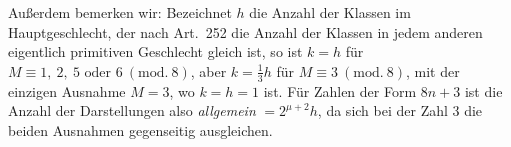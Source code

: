 Außerdem bemerken wir: Bezeichnet $h$ die Anzahl der Klassen
im Hauptgeschlecht, der nach Art.\ 252 die Anzahl der Klassen in
jedem anderen eigentlich primitiven Geschlecht gleich ist, so ist
$k=h$ für $M\equiv1,\allowbreak \ 2,\allowbreak \ 5\text{ oder }6\ (\mathrm{mod.}\ 8)$, aber $k=\tfrac{1}{3}h$ für $M\equiv3\ (\mathrm{mod.}\ 8)$, mit der einzigen
Ausnahme $M=3$, wo $k=h=1$ ist. Für Zahlen der Form $8n+3$
ist die Anzahl der Darstellungen also \textit{allgemein} $=2^{\mu+2}h$,
da sich bei der Zahl $3$ die beiden Ausnahmen gegenseitig ausgleichen.
